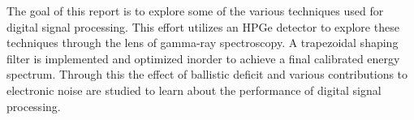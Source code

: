 	The goal of this report is to explore some of the various techniques used for digital signal processing. 
This effort utilizes an HPGe detector to explore these techniques through the lens of gamma-ray spectroscopy. 
A trapezoidal shaping filter is implemented and optimized inorder to achieve a final calibrated energy spectrum. 
Through this the effect of ballistic deficit and various contributions to electronic noise are studied to learn about the performance of digital signal processing. 
  
